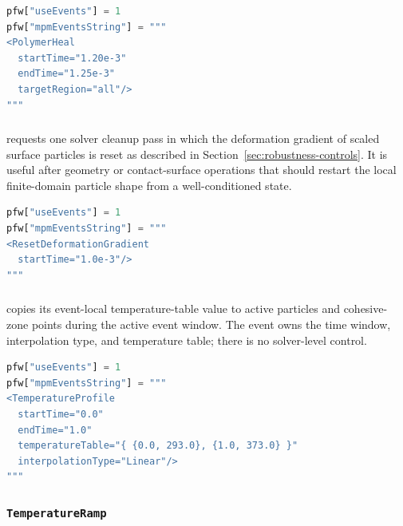 \begin{lstlisting}[language=Python,caption={Polymer-healing event.}]
pfw["useEvents"] = 1
pfw["mpmEventsString"] = """
<PolymerHeal
  startTime="1.20e-3"
  endTime="1.25e-3"
  targetRegion="all"/>
"""
\end{lstlisting}

\subsubsection{}

 requests one solver cleanup pass in which the deformation gradient of scaled surface particles is reset as described in Section~\ref{sec:robustness-controls}.  It is useful after geometry or contact-surface operations that should restart the local finite-domain particle shape from a well-conditioned state.

\begin{lstlisting}[language=Python,caption={Reset-deformation-gradient event.}]
pfw["useEvents"] = 1
pfw["mpmEventsString"] = """
<ResetDeformationGradient
  startTime="1.0e-3"/>
"""
\end{lstlisting}

\subsubsection{}

 copies its event-local temperature-table value to active particles and cohesive-zone points during the active event window.  The event owns the time window, interpolation type, and temperature table; there is no solver-level  control.

\begin{lstlisting}[language=Python,caption={Temperature-profile event.}]
pfw["useEvents"] = 1
pfw["mpmEventsString"] = """
<TemperatureProfile
  startTime="0.0"
  endTime="1.0"
  temperatureTable="{ {0.0, 293.0}, {1.0, 373.0} }"
  interpolationType="Linear"/>
"""
\end{lstlisting}

\subsubsection{\texttt{TemperatureRamp}}

